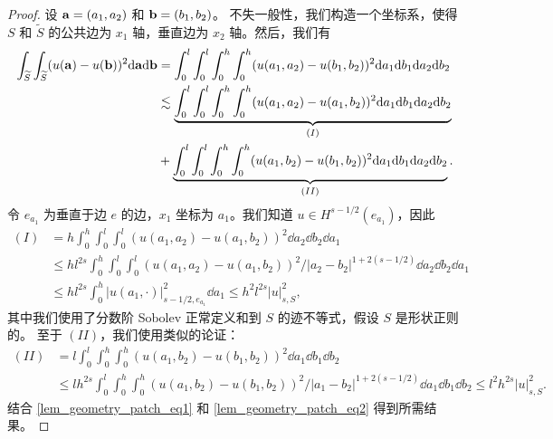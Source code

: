 \begin{proof}

设 $\mathbf{a}=(a_1,a_2)$ 和 $\mathbf{b}=(b_1,b_2)$。
不失一般性，我们构造一个坐标系，使得 $S$ 和 $\widetilde{S}$ 的公共边为 $x_1$ 轴，垂直边为 $x_2$ 轴。然后，我们有
\begin{equation}
\begin{split}
\label{lem_geometry_patch_eq1}
\int_{\widetilde{S}} \int_{\widetilde{S}} (u(\mathbf{a}) - u(\mathbf{b}) )^2 \mathrm{ d} \mathbf{a} \mathrm{ d} \mathbf{b} & = \int_0^l \int_0^l \int_0^h \int_0^h (u(a_1,a_2) - u(b_1,b_2) )^2  \mathrm{ d} a_1 \mathrm{ d} b_1 \mathrm{ d} a_2 \mathrm{ d} b_2 \\
& \lesssim \underbrace{ \int_0^l \int_0^l \int_0^h \int_0^h (u(a_1,a_2) - u(a_1,b_2) )^2  \mathrm{ d} a_1 \mathrm{ d} b_1  \mathrm{ d} a_2 \mathrm{ d} b_2}_{(I)} \\
& + \underbrace{ \int_0^l \int_0^l \int_0^h \int_0^h (u(a_1, b_2) - u(b_1,b_2) )^2  \mathrm{ d} a_1 \mathrm{ d} b_1 \mathrm{ d} a_2 \mathrm{ d} b_2 }_{(II)}.
\end{split}
\end{equation}
令 $e_{a_1}$ 为垂直于边 $e$ 的边，$x_1$ 坐标为 $a_1$。我们知道 $u \in H^{s-1/2}(e_{a_1})$，因此
\begin{equation}
\begin{split}
\label{lem_geometry_patch_eq2}
(I) & = h \int_0^h \int_0^l \int_0^l  (u(a_1,a_2) - u(a_1,b_2) )^2 \dd a_2 \dd b_2  \dd a_1  \\
& \le h l^{2s}  \int_0^h \int_0^l \int_0^l  (u(a_1,a_2) - u(a_1,b_2) )^2/ |a_2-b_2|^{1+2(s-1/2)} \dd a_2 \dd b_2  \dd a_1 \\
& \le h l^{2s} \int_0^h |u(a_1,\cdot)|^2_{s-1/2,e_{a_1}} \dd a_1 \le h^2 l^{2s}  |u |^2_{s,S},
\end{split}
\end{equation}
其中我们使用了分数阶 Sobolev 正常定义和到 $S$ 的迹不等式，假设 $S$ 是形状正则的。
至于 $(II)$，我们使用类似的论证：
\begin{equation}
\begin{split}
\label{lem_geometry_patch_eq3}
(II) &= l \int_0^l  \int_0^h \int_0^h (u(a_1, b_2) - u(b_1,b_2) )^2  \dd a_1 \dd b_1  \dd b_2 \\
& \le l h^{2s} \int_0^l  \int_0^h \int_0^h (u(a_1, b_2) - u(b_1,b_2) )^2/ |a_1 - b_2|^{1+2(s-1/2)}  \dd a_1 \dd b_1  \dd b_2 \le l^2 h^{2s}  |u |^2_{s,S}.
\end{split}
\end{equation}
结合 \eqref{lem_geometry_patch_eq1} 和 \eqref{lem_geometry_patch_eq2} 得到所需结果。
\end{proof}

